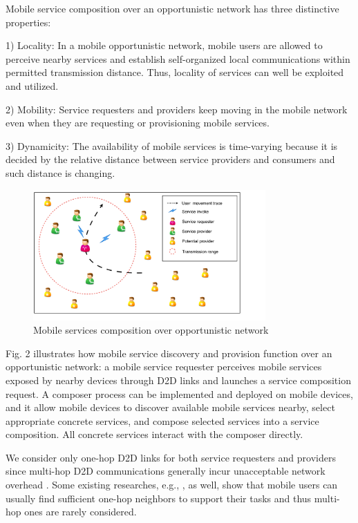\documentclass[journal]{IEEEtran}
\begin{document}
Mobile service composition over an opportunistic network has three distinctive properties:

1) Locality: In a mobile opportunistic network, mobile users are allowed to perceive nearby services and establish self-organized local communications within permitted transmission distance. Thus, locality of services can well be exploited and utilized.

2) Mobility: Service requesters and providers keep moving in the mobile network even when they are requesting or provisioning mobile services.

3) Dynamicity: The availability of mobile services is time-varying because it is decided by the relative distance between service providers and consumers and such distance is changing.

\begin{figure}[!t]
\centering
\includegraphics[width=3.5in]{./img/pic2.pdf}
\caption{Mobile services composition over opportunistic network}
\label{fig_MSCON}
\end{figure}

Fig. 2 illustrates how mobile service discovery and provision function over an opportunistic network: a mobile service requester perceives mobile services exposed by nearby devices through D2D links and launches a service composition request. 
A composer process can be implemented and deployed on mobile devices, and it allow mobile devices to discover available mobile services nearby, select appropriate concrete services, and compose selected services into a service composition. 
All concrete services interact with the composer directly.

We consider only one-hop D2D links for both service requesters and providers since multi-hop D2D communications generally incur unacceptable network overhead \cite{li2014can}. 
Some existing researches, e.g., \cite{chang2015progressive, tuncay2013participant, wu2013homing, jiang2016exploiting, liu2013exploring}, as well, show that mobile users can usually find sufficient one-hop neighbors to support their tasks and thus multi-hop ones are rarely considered.
\end{document}
